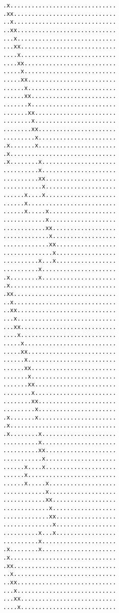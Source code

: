 {%
\fontsize{3}{0}%
\selectfont%
\begin{verbatim}.x..............................
.xx.............................
..x.............................
..xx............................
...x............................
...xx...........................
....x...........................
....xx..........................
.....x..........................
.....xx.........................
......x.........................
......xx........................
.......x........................
.......xx.......................
........x.......................
........xx......................
.........x......................
.x.......x......................
.x..............................
.x........x.....................
..........x.....................
..........xx....................
...........x....................
......x....x....................
......x.........................
......x.....x...................
............x...................
............xx..................
.............x..................
.............xx.................
..............x.................
..........x...x.................
..........x.....................
.x........x.....................
.x..............................
.xx.............................
..x.............................
..xx............................
...x............................
...xx...........................
....x...........................
.....x..........................
.....xx.........................
......x.........................
......xx........................
.......x........................
.......xx.......................
........x.......................
........xx......................
.........x......................
.x.......x......................
.x..............................
.x........x.....................
..........x.....................
..........xx....................
...........x....................
......x....x....................
......x.........................
......x.....x...................
............x...................
............xx..................
.............x..................
.............xx.................
..............x.................
..........x...x.................
..........x.....................
.x........x.....................
.x..............................
.xx.............................
..x.............................
..xx............................
...x............................
...xx...........................
....x...........................\end{verbatim}
}
